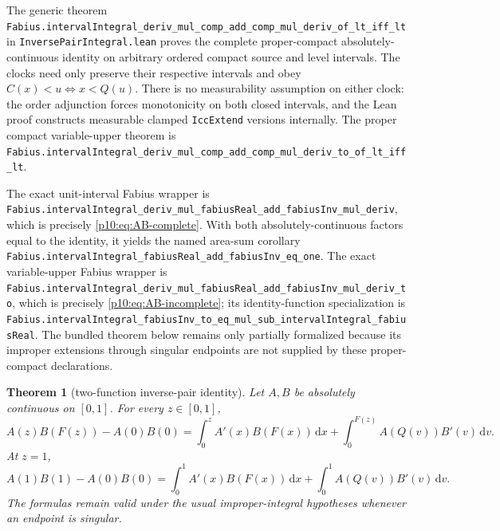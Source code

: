 \documentclass[11pt,oneside]{article}
\newtheorem{theorem}{Theorem}[section]
\theoremstyle{definition}
\theoremstyle{remark}
\newcommand{\F}{F}
\newcommand{\Q}{Q}
\newcommand{\dd}{\,\mathrm d}
\newcommand{\1}{\mathbf 1}
\begin{document}
\begin{statusbox}
The generic theorem
\nolinkurl{Fabius.intervalIntegral_deriv_mul_comp_add_comp_mul_deriv_of_lt_iff_lt}
in \texttt{InversePairIntegral.lean} proves the complete proper-compact
absolutely-continuous identity on arbitrary ordered compact source and level intervals.
The clocks need only preserve their respective intervals and obey
\(C(x)<u\Longleftrightarrow x<Q(u)\).  There is no measurability assumption on either
clock: the order adjunction forces monotonicity on both closed intervals, and the Lean
proof constructs measurable clamped \texttt{IccExtend} versions internally.
The proper compact variable-upper theorem is
\nolinkurl{Fabius.intervalIntegral_deriv_mul_comp_add_comp_mul_deriv_to_of_lt_iff_lt}.

The exact unit-interval Fabius wrapper is
\nolinkurl{Fabius.intervalIntegral_deriv_mul_fabiusReal_add_fabiusInv_mul_deriv},
which is precisely \cref{p10:eq:AB-complete}.  With both absolutely-continuous factors
equal to the identity, it yields the named area-sum corollary
\nolinkurl{Fabius.intervalIntegral_fabiusReal_add_fabiusInv_eq_one}.  The exact
variable-upper Fabius wrapper is
\nolinkurl{Fabius.intervalIntegral_deriv_mul_fabiusReal_add_fabiusInv_mul_deriv_to},
which is precisely \cref{p10:eq:AB-incomplete}; its identity-function specialization is
\nolinkurl{Fabius.intervalIntegral_fabiusInv_to_eq_mul_sub_intervalIntegral_fabiusReal}.
The bundled theorem below remains only partially formalized because its improper
extensions through singular endpoints are not supplied by these proper-compact declarations.
\end{statusbox}

\begin{theorem}[two-function inverse-pair identity]\label{p10:thm:AB}
Let \(A,B\) be absolutely continuous on \([0,1]\).  For every \(z\in[0,1]\),
\begin{equation}\label{p10:eq:AB-incomplete}
 A(z)B(\F(z))-A(0)B(0)
 =\int_0^z A'(x)B(\F(x))\dd x
 +\int_0^{\F(z)}A(\Q(v))B'(v)\dd v.
\end{equation}
At \(z=1\),
\begin{equation}\label{p10:eq:AB-complete}
 A(1)B(1)-A(0)B(0)
 =\int_0^1A'(x)B(\F(x))\dd x
 +\int_0^1A(\Q(v))B'(v)\dd v.
\end{equation}
The formulas remain valid under the usual improper-integral hypotheses whenever an
endpoint is singular.
\end{theorem}
\end{document}
